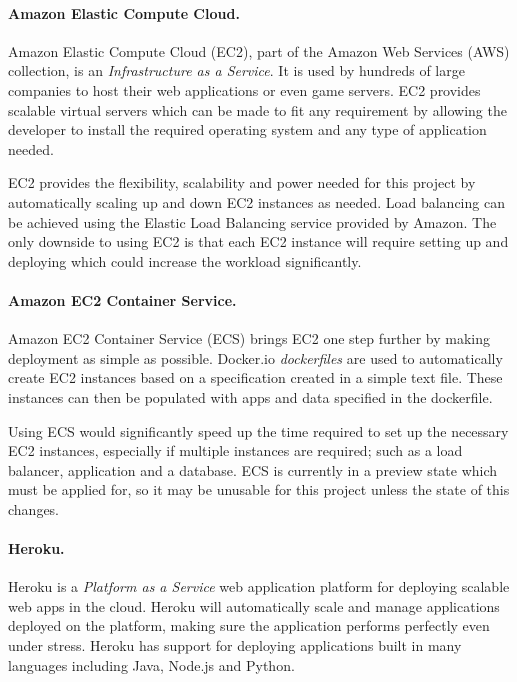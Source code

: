 \documentclass[a4paper, 12pt]{article}
\begin{document}
\paragraph{Amazon Elastic Compute Cloud.}
Amazon Elastic Compute Cloud (EC2), part of the Amazon Web Services (AWS) collection, is an \emph{Infrastructure as a Service}.\cite{awsec2} It is used by hundreds of large companies to host their web applications or even game servers. EC2 provides scalable virtual servers which can be made to fit any requirement by allowing the developer to install the required operating system and any type of application needed.

EC2 provides the flexibility, scalability and power needed for this project by automatically scaling up and down EC2 instances as needed.\cite{awsec2} Load balancing can be achieved using the Elastic Load Balancing service provided by Amazon.\cite{elasticloadbalancing} The only downside to using EC2 is that each EC2 instance will require setting up and deploying which could increase the workload significantly.

\paragraph{Amazon EC2 Container Service.}
Amazon EC2 Container Service (ECS) brings EC2 one step further by making deployment as simple as possible. Docker.io \emph{dockerfiles} are used to automatically create EC2 instances based on a specification created in a simple text file.\cite{awsecs} These instances can then be populated with apps and data specified in the dockerfile.\cite{dockerfile}

Using ECS would significantly speed up the time required to set up the necessary EC2 instances, especially if multiple instances are required; such as a load balancer, application and a database. ECS is currently in a preview state which must be applied for, so it may be unusable for this project unless the state of this changes.

\paragraph{Heroku.}
Heroku is a \emph{Platform as a Service} web application platform for deploying scalable web apps in the cloud. Heroku will automatically scale and manage applications deployed on the platform, making sure the application performs perfectly even under stress.\cite{heroku} Heroku has support for deploying applications built in many languages including Java, Node.js and Python.
\end{document}

